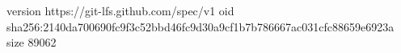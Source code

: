version https://git-lfs.github.com/spec/v1
oid sha256:2140da700690fc9f3c52bbd46fc9d30a9cf1b7b786667ac031cfc88659e6923a
size 89062
